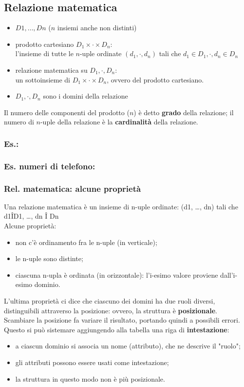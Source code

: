 \subsection{Relazione matematica}
\begin{itemize}
    \item $D1, \dots, Dn$ ($n$ insiemi anche non distinti)
    \item prodotto cartesiano $D_1 \times \cdot \times D_n$:
    \\l'insieme di tutte le $n$-uple ordinate $(d_1, \cdot, d_n)$ tali che $d_1 \in D_1, \cdot, d_n \in D_n$
    \item relazione matematica su $D_1, \cdot, D_n$:
    \\un sottoinsieme di $D_1 \times \cdot \times D_n$, ovvero del prodotto cartesiano.
    \item $D_1, \cdot, D_n$ sono i domini della relazione
\end{itemize}
Il numero delle componenti del prodotto ($n$) è detto \textbf{grado} della relazione; il numero di $n$-uple della relazione è la \textbf{cardinalità} della relazione.

\subsubsection{Es.:}

\subsubsection{Es. numeri di telefono:}

\subsubsection{Rel. matematica: alcune proprietà}
Una relazione matematica è un insieme di n-uple ordinate: (d1, …, dn) tali che d1ÎD1, …, dn Î Dn
\\Alcune proprietà:
\begin{itemize}
    \item non c'è ordinamento fra le n-uple (in verticale);
    \item le n-uple sono distinte;
    \item ciascuna n-upla è ordinata (in orizzontale): l'i-esimo valore proviene dall'i-esimo dominio.
\end{itemize}
L'ultima proprietà ci dice che ciascuno dei domini ha due ruoli diversi, distinguibili attraverso la posizione: ovvero, la struttura è \textbf{posizionale}. Scambiare la posizione fa variare il risultato, portando quindi a possibili errori.
\\Questo si può sistemare aggiungendo alla tabella una riga di \textbf{intestazione}:
\begin{itemize}
    \item a ciascun dominio si associa un nome (attributo), che ne descrive il "ruolo";
    \item gli attributi possono essere usati come intestazione;
    \item la struttura in questo modo non è più posizionale.
\end{itemize}

